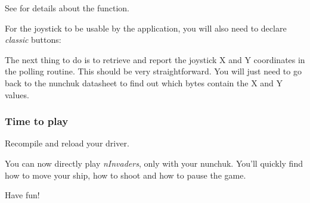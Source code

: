 See  for details about
the  function.

For the joystick to be usable by the application, you will also
need to declare {\em classic} buttons:


The next thing to do is to retrieve and report the joystick X and Y
coordinates in the polling routine. This should be very straightforward.
You will just need to go back to the nunchuk datasheet to find out
which bytes contain the X and Y values.

\subsubsection{Time to play}

Recompile and reload your driver.

You can now directly play {\em nInvaders}, only with your nunchuk.
You'll quickly find how to move your ship, how to shoot and how
to pause the game.

Have fun!
